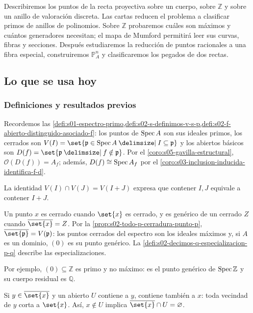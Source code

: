 \begin{obs}
\label{obs:s08-objetivos-puntos}
Describiremos los puntos de la recta proyectiva sobre un cuerpo, sobre $\mathbb Z$ y sobre un anillo de valoración discreta. Las cartas reducen el problema a clasificar primos de anillos de polinomios. Sobre $\mathbb Z$ probaremos cuáles son máximos y cuántos generadores necesitan; el mapa de Mumford permitirá leer sus curvas, fibras y secciones. Después estudiaremos la reducción de puntos racionales a una fibra especial, construiremos $\mathbb P_A^n$ y clasificaremos los pegados de dos rectas.
\end{obs}

\subsection{Lo que se usa hoy}

\subsubsection{Definiciones y resultados previos}
Recordemos las \cref{defi:s01-espectro-primo,defi:s02-s-definimos-v-s-p,defi:s02-f-abierto-distinguido-asociado-f}: los puntos de $\operatorname{Spec} A$ son sus ideales primos, los cerrados son $V(I)=\set{\mathfrak p\in\Spec A\given I\subseteq\mathfrak p}$ y los abiertos básicos son $D(f)=\set{\mathfrak p\given f\notin\mathfrak p}$. Por el \cref{coro:s05-gavilla-estructural}, $\mathcal O(D(f))=A_f$; además, $D(f)\cong\operatorname{Spec} A_f$ por el \cref{coro:s03-inclusion-inducida-identifica-f-d}.

La identidad $V(I)\cap V(J)=V(I+J)$ expresa que contener $I,J$ equivale a contener $I+J$.

Un punto $x$ es cerrado cuando $\set{x}$ es cerrado, y es genérico de un cerrado $Z$ cuando $\overline{\set{x}}=Z$. Por la \cref{prop:s02-todo-p-cerradura-punto-p}, $\overline{\set{\mathfrak p}}=V(\mathfrak p)$: los puntos cerrados del espectro son los ideales máximos y, si $A$ es un dominio, $(0)$ es su punto genérico. La \cref{defi:s02-decimos-q-especializacion-p-q} describe las especializaciones.

Por ejemplo, $(0)\subseteq\mathbb Z$ es primo y no máximo: es el punto genérico de $\operatorname{Spec}\mathbb Z$ y su cuerpo residual es $\mathbb Q$.

\begin{obs}
\label{obs:s08-especializacion-local}
Si $y\in\overline{\set{x}}$ y un abierto $U$ contiene a $y$, contiene también a $x$: toda vecindad de $y$ corta a $\set{x}$. Así, $x\notin U$ implica $\overline{\set{x}}\cap U=\varnothing$.
\end{obs}

